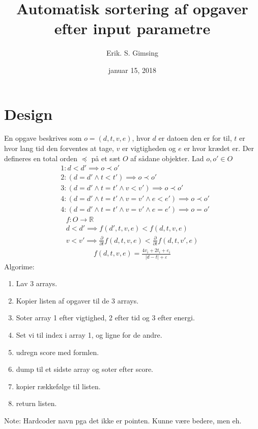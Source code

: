\documentclass{article}
\title{Automatisk sortering af opgaver efter input parametre}
\author{Erik. S. Gimsing}
\date{januar 15, 2018}
\begin{document}
\maketitle
\section{Design}
En opgave beskrives som $o = (d,t,v,e)$, hvor $d$ er datoen den er for til, $t$
er hvor lang tid den forventes at tage, $v$ er vigtigheden og $e$ er hvor
kr{\ae}det er. Der defineres en total orden $\preceq$ p{\aa} et s{\ae}t $O$ af
s{\aa}dane objekter. Lad $o,o' \in O$
\begin{align*}
	&1:d < d' \implies o \prec o' \\
	&2:(d = d' \land t < t') \implies o \prec o' \\
	&3:(d = d' \land t = t' \land v < v') \implies o \prec o' \\
	&4:(d = d' \land t = t' \land v = v' \land e < e') \implies o \prec o' \\
	&4:(d = d' \land t = t' \land v = v' \land e = e') \implies o = o'
\end{align*}
\begin{align*}
	f: O \rightarrow \mathbb{R} \\
	d < d' \implies f(d',t,v,e) < f(d,t,v,e) \\
	v < v' \implies \frac{\partial}{\partial t} f(d,t,v,e) <
	\frac{\partial}{\partial t} f(d,t,v',e)
\end{align*}
\begin{align*}
	f(d,t,v,e) = \frac{4v_i+2t_i+e_i}{|d-t|+\varepsilon}
\end{align*}
Algorime:
\begin{enumerate}
	\item Lav 3 arrays.
	\item Kopier listen af opgaver til de 3 arrays.
	\item Soter array 1 efter vigtighed, 2 efter tid og 3 efter energi.
	\item Set vi til index i array 1, og ligne for de andre.
	\item udregn score med formlen.
	\item dump til et sidste array og soter efter score.
	\item kopier r{\ae}kkef{\o}lge til listen.
	\item return listen.
\end{enumerate}
Note: Hardcoder navn pga det ikke er pointen. Kunne v{\ae}re bedere, men eh.
\end{document}
